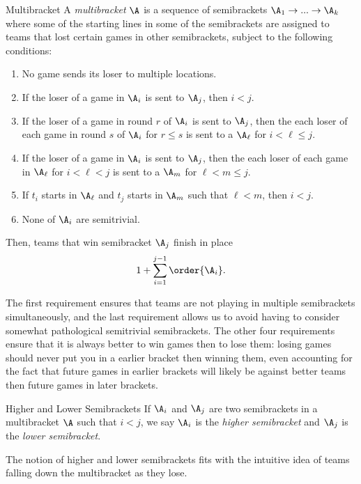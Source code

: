 {    \begin{definition}{Multibracket}{}
        A \textit{multibracket} $\A$ is a sequence of semibrackets $\A_1 \to ... \to \A_k$ where some of the starting lines in some of the semibrackets are assigned to teams that lost certain games in other semibrackets, subject to the following conditions:
        \begin{enumerate}
            \item No game sends its loser to multiple locations.
            \item If the loser of a game in $\A_i$ is sent to $\A_j$, then $i < j.$
            \item If the loser of a game in round $r$ of $\A_i$ is sent to $\A_j$, then the each loser of each game in round $s$ of $\A_i$ for $r \leq s$ is sent to a $\A_\ell$ for $i < \ell \leq j.$
            \item If the loser of a game in $\A_i$ is sent to $\A_j$, then the each loser of each game in $\A_\ell$ for $i < \ell < j$ is sent to a $\A_m$ for $\ell < m \leq j.$
            \item If $t_i$ starts in $\A_\ell$ and $t_j$ starts in $\A_m$ such that $\ell < m$, then $i < j.$
            \item None of $\A_i$ are semitrivial.
        \end{enumerate}

        Then, teams that win semibracket $\A_j$ finish in place $$1 + \sum_{i=1}^{j-1} \order{\A_i}.$$
    \end{definition}

    The first requirement ensures that teams are not playing in multiple semibrackets simultaneously, and the last requirement allows us to avoid having to consider somewhat pathological semitrivial semibrackets. The other four requirements ensure that it is always better to win games then to lose them: losing games should never put you in a earlier bracket then winning them, even accounting for the fact that future games in earlier brackets will likely be against better teams then future games in later brackets.

    \begin{definition}{Higher and Lower Semibrackets}{}
        If $\A_i$ and $\A_j$ are two semibrackets in a multibracket $\A$ such that $i < j$, we say $\A_i$ is the \textit{higher semibracket} and $\A_j$ is the \textit{lower semibracket}.
    \end{definition}

    The notion of higher and lower semibrackets fits with the intuitive idea of teams falling down the multibracket as they lose.

}
